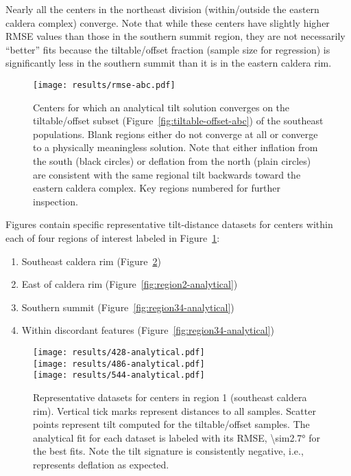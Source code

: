 Nearly all the centers in the northeast division (within/outside the eastern caldera complex) converge. Note that while these centers have slightly higher \acs{RMSE} values than those in the southern summit region, they are not necessarily ``better'' fits because the tiltable/offset fraction (sample size for regression) is significantly less in the southern summit than it is in the eastern caldera rim.

\begin{figure}
    \texttt{[image: results/rmse-abc.pdf]}%
    \caption[Centers by analytical convergence]{Centers for which an analytical tilt solution converges on the tiltable/offset subset (Figure~\ref{fig:tiltable-offset-abc}) of the southeast populations. Blank regions either do not converge at all or converge to a physically meaningless solution. Note that either inflation from the south (black circles) or deflation from the north (plain circles) are consistent with the same regional tilt backwards toward the eastern caldera complex. Key regions numbered for further inspection.}%
    \label{fig:rmse-abc}
\end{figure}

Figures contain specific representative tilt-distance datasets for centers within each of four regions of interest labeled in Figure~\ref{fig:rmse-abc}:

\begin{enumerate}
    \item Southeast caldera rim (Figure~\ref{fig:region1-analytical})
    \item East of caldera rim (Figure~\ref{fig:region2-analytical})
    \item Southern summit (Figure~\ref{fig:region34-analytical})
    \item Within discordant features (Figure~\ref{fig:region34-analytical})
\end{enumerate}

\begin{figure}
    \vspace{-15pt}
    \texttt{[image: results/428-analytical.pdf]}\\
    \texttt{[image: results/486-analytical.pdf]}\\
    \texttt{[image: results/544-analytical.pdf]}%
    \caption[Southeast caldera rim: analytical fit]{Representative datasets for centers in region 1 (southeast caldera rim). Vertical tick marks represent distances to all samples. Scatter points represent tilt computed for the tiltable/offset samples. The analytical fit for each dataset is labeled with its \acs{RMSE}, \ang{\sim2.7} for the best fits. Note the tilt signature is consistently negative, i.e., represents deflation as expected.}
    \label{fig:region1-analytical}
\end{figure}

